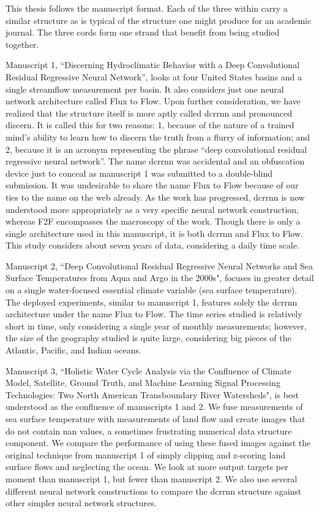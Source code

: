 \startpreface

This thesis follows the manuscript format. Each of the three within carry a similar structure as is typical of the structure one might produce for an academic journal. The three cords form one strand that benefit from being studied together.

Manuscript 1, “Discerning Hydroclimatic Behavior with a Deep Convolutional Residual Regressive Neural Network”, looks at four United States basins and a single streamflow measurement per basin. It also considers just one neural network architecture called Flux to Flow. Upon further consideration, we have realized that the structure itself is more aptly called dcrrnn and pronounced discern. It is called this for two reasons: 1, because of the nature of a trained mind’s ability to learn how to discern the truth from a flurry of information; and 2, because it is an acronym representing the phrase “deep convolutional residual regressive neural network”. The name dcrrnn was accidental and an obfuscation device just to conceal as manuscript 1 was submitted to a double-blind submission. It was undesirable to share the name Flux to Flow because of our ties to the name on the web already. As the work has progressed, dcrrnn is now understood more appropriately as a very specific neural network construction, whereas F2F encompasses the macroscopy of the work. Though there is only a single architecture used in this manuscript, it is both dcrrnn and Flux to Flow. This study considers about seven years of data, considering a daily time scale.

Manuscript 2, “Deep Convolutional Residual Regressive Neural Networks and Sea Surface Temperatures from Aqua and Argo in the 2000s", focuses in greater detail on a single water-focused essential climate variable (sea surface temperature). The deployed experiments, similar to manuscript 1, features solely the dcrrnn architecture under the name Flux to Flow. The time series studied is relatively short in time, only considering a single year of monthly measurements; however, the size of the geography studied is quite large, considering big pieces of the Atlantic, Pacific, and Indian oceans.

Manuscript 3, “Holistic Water Cycle Analysis via the Confluence of Climate Model, Satellite, Ground Truth, and Machine Learning Signal Processing Technologies: Two North American Transboundary River Watersheds", is best understood as the confluence of manuscripts 1 and 2. We fuse measurements of sea surface temperature with measurements of land flow and create images that do not contain nan values, a sometimes frustrating numerical data structure component. We compare the performance of using these fused images against the original technique from manuscript 1 of simply clipping and z-scoring land surface flows and neglecting the ocean. We look at more output targets per moment than manuscript 1, but fewer than manuscript 2. We also use several different neural network constructions to compare the dcrrnn structure against other simpler neural network structures.
